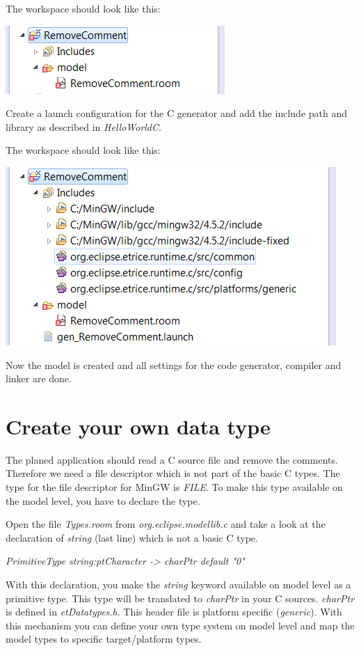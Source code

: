 The workspace should look like this:

\includegraphics{images/036-RemoveCommentC01.png}

Create a launch configuration for the C generator and add the include path and library as described in 
\textit{HelloWorldC}.

The workspace should look like this:

\includegraphics{images/036-RemoveCommentC02.png}

Now the model is created and all settings for the code generator, compiler and linker are done.


\section{Create your own data type}

The planed application should read a C source file and remove the comments. Therefore we need a file 
descriptor which is not part of the basic C types. The type for the file descriptor for MinGW is 
\textit{FILE}. To make this type available on the model level, you have to declare the type. 

Open the file \textit{Types.room} from \textit{org.eclipse.modellib.c} and take a look at the declaration 
of \textit{string} (last line) which is not a basic C type.

\textit{PrimitiveType string:ptCharacter -> charPtr default "0"}

With this declaration, you make the \textit{string} keyword available on model level as a primitive type. 
This type will be translated to \textit{charPtr} in your C sources. \textit{charPtr} is defined in 
\textit{etDatatypes.h}. This header file is platform specific (\textit{generic}). With this mechanism you 
can define your own type system on model level and map the model types to specific target/platform types. 

